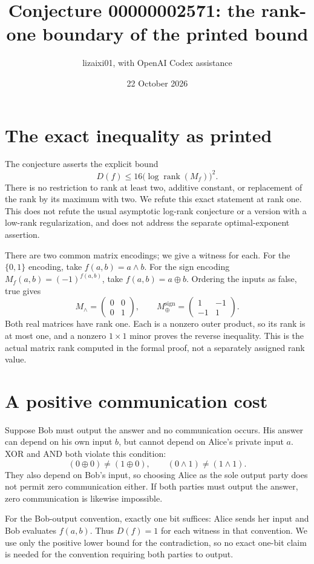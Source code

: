 \documentclass[11pt]{article}
\title{Conjecture 00000002571: the rank-one boundary of the printed bound}
\author{lizaixi01, with OpenAI Codex assistance}
\date{22 October 2026}
\begin{document}
\maketitle
\section{The exact inequality as printed}
The conjecture asserts the explicit bound
\[
 D(f)\leq 16\bigl(\log\operatorname{rank}(M_f)\bigr)^2.
\]
There is no restriction to rank at least two, additive constant, or
replacement of the rank by its maximum with two. We refute this exact
statement at rank one. This does not refute the usual asymptotic
log-rank conjecture or a version with a low-rank regularization, and
does not address the separate optimal-exponent assertion.

There are two common matrix encodings; we give a witness for each.
For the $\{0,1\}$ encoding, take $f(a,b)=a\land b$. For the sign
encoding $M_f(a,b)=(-1)^{f(a,b)}$, take $f(a,b)=a\mathbin\oplus b$.
Ordering the inputs as false, true gives
\[
 M_{\land}=\begin{pmatrix}0&0\\0&1\end{pmatrix},\qquad
 M_{\oplus}^{\mathrm{sign}}=\begin{pmatrix}1&-1\\-1&1\end{pmatrix}.
\]
Both real matrices have rank one. Each is a nonzero outer product,
so its rank is at most one, and a nonzero $1\times1$ minor proves
the reverse inequality. This is the actual matrix rank computed
in the formal proof, not a separately assigned rank value.

\section{A positive communication cost}
Suppose Bob must output the answer and no communication occurs.
His answer can depend on his own input $b$, but cannot depend on
Alice's private input $a$. XOR and AND both violate this condition:
\[
 (0\oplus0)\ne(1\oplus0),\qquad
 (0\land1)\ne(1\land1).
\]
They also depend on Bob's input, so choosing Alice as the sole
output party does not permit zero communication either.
If both parties must output the answer, zero communication is
likewise impossible.

For the Bob-output convention, exactly one bit suffices: Alice
sends her input and Bob evaluates $f(a,b)$. Thus $D(f)=1$ for each
witness in that convention. We use only the positive lower bound
for the contradiction, so no exact one-bit claim is needed for
the convention requiring both parties to output.
\end{document}
